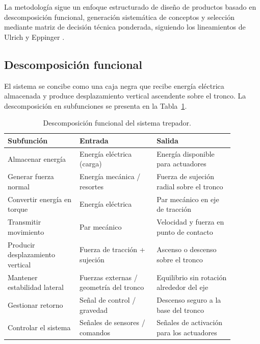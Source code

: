 \documentclass[lettersize,journal]{IEEEtran}
\begin{document}
La metodología sigue un enfoque estructurado de diseño de productos basado en
descomposición funcional, generación sistemática de conceptos y selección mediante
matriz de decisión técnica ponderada, siguiendo los lineamientos de Ulrich y
Eppinger \cite{UlrichEppinger2012}.

\subsection{\textbf{Descomposición funcional}}

El sistema se concibe como una caja negra que recibe energía eléctrica almacenada
y produce desplazamiento vertical ascendente sobre el tronco. La descomposición en
subfunciones se presenta en la Tabla~\ref{tab:descomposicion}.

\begin{table}[H]
\centering
\caption{Descomposición funcional del sistema trepador.}
\label{tab:descomposicion}
\footnotesize
\begin{tabular}{p{0.28\linewidth} p{0.30\linewidth} p{0.30\linewidth}}
\toprule
\textbf{Subfunción} & \textbf{Entrada} & \textbf{Salida} \\
\midrule
Almacenar energía
    & Energía eléctrica (carga)
    & Energía disponible para actuadores \\
Generar fuerza normal
    & Energía mecánica / resortes
    & Fuerza de sujeción radial sobre el tronco \\
Convertir energía en torque
    & Energía eléctrica
    & Par mecánico en eje de tracción \\
Transmitir movimiento
    & Par mecánico
    & Velocidad y fuerza en punto de contacto \\
Producir desplazamiento vertical
    & Fuerza de tracción + sujeción
    & Ascenso o descenso sobre el tronco \\
Mantener estabilidad lateral
    & Fuerzas externas / geometría del tronco
    & Equilibrio sin rotación alrededor del eje \\
Gestionar retorno
    & Señal de control / gravedad
    & Descenso seguro a la base del tronco \\
Controlar el sistema
    & Señales de sensores / comandos
    & Señales de activación para los actuadores \\
\bottomrule
\end{tabular}
\end{table}
\end{document}
